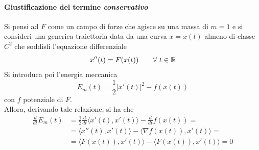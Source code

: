 \paragraph{Giustificazione del termine \textit{conservativo}}
Si pensi ad $F$ come un campo di forze che agisce su una massa di $m=1$ e si consideri una generica traiettoria data da una curva $x=x(t)$ almeno di classe $C^2$ che soddisfi l'equazione differenziale 
\begin{equation}
    x''(t)=F(x(t)) \qquad \forall\ t \in \mathbb{R}
\end{equation}
Si introduca poi l'energia meccanica 
\begin{equation}
    E_m(t)= \frac{1}{2} |x'(t)|^2- f(x(t))
\end{equation}
con $f$ potenziale di $F$.\\
Allora, derivando tale relazione, si ha che
\begin{equation}
\begin{aligned}
        \frac{d}{dt}{E_m(t)}&=\frac{1}{2} \frac{d}{dt}{ \langle x'(t), x'(t) \rangle}- \frac{d}{dt}{f(x(t))}=\\
        &= \langle x''(t), x'(t) \rangle- \langle \nabla f(x(t)), x'(t) \rangle =\\
        &= \langle F(x(t)), x'(t) \rangle - \langle F(x(t)), x'(t) \rangle =0
\end{aligned}    
\end{equation}

